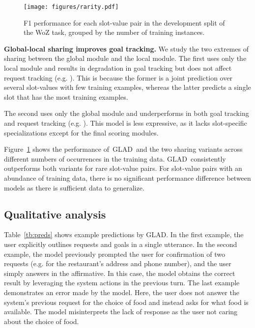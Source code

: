 \documentclass[11pt,a4paper]{article}
\newcommand{\modelnameshort}{GLAD}
\begin{document}
\begin{figure}[t]
\centering
\texttt{[image: figures/rarity.pdf]}
\caption{
F1 performance for each slot-value pair in the development split of the WoZ task, grouped by the number of training instances.
}
\label{fig:rarity}
\vspace{-0.2cm}
\end{figure}








\textbf{Global-local sharing improves goal tracking.}
We study the two extremes of sharing between the global module and the local module.
The first uses only the local module and results in degradation in goal tracking but does not affect request tracking (e.g. ).
This is because the former is a joint prediction over several slot-values with few training examples, whereas the latter predicts a single slot that has the most training examples.

The second uses only the global module and underperforms in both goal tracking and request tracking (e.g. ).
This model is less expressive, as it lacks slot-specific specializations except for the final scoring modules.

Figure~\ref{fig:rarity} shows the performance of~\modelnameshort~and the two sharing variants across different numbers of occurrences in the training data.
\modelnameshort~consistently outperforms both variants for rare slot-value pairs.
For slot-value pairs with an abundance of training data, there is no significant performance difference between models as there is sufficient data to generalize.



\subsection{Qualitative analysis}


Table~\ref{tb:preds} shows example predictions by \modelnameshort.
In the first example, the user explicitly outlines requests and goals in a single utterance.
In the second example, the model previously prompted the user for confirmation of two requests (e.g. for the restaurant's address and phone number), and the user simply answers in the affirmative.
In this case, the model obtains the correct result by leveraging the system actions in the previous turn.
The last example demonstrates an error made by the model.
Here, the user does not answer the system's previous request for the choice of food and instead asks for what food is available.
The model misinterprets the lack of response as the user not caring about the choice of food.
\end{document}

